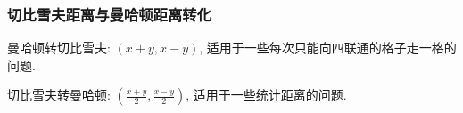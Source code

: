 \subsubsection{切比雪夫距离与曼哈顿距离转化}
曼哈顿转切比雪夫: $(x+y,x-y)$, 适用于一些每次只能向四联通的格子走一格的问题.

切比雪夫转曼哈顿: $(\frac{x+y}{2}, \frac{x-y}{2})$, 适用于一些统计距离的问题.